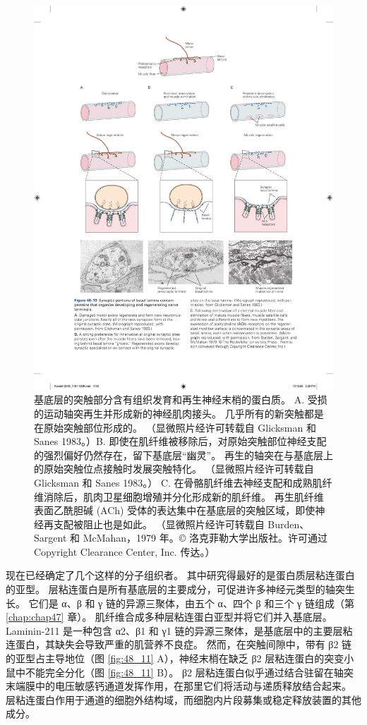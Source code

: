 \begin{figure}[htbp]
	\centering
	\includegraphics[width=0.9\linewidth]{chap48/fig_48_10}
	\caption{基底层的突触部分含有组织发育和再生神经末梢的蛋白质。 A. 受损的运动轴突再生并形成新的神经肌肉接头。 几乎所有的新突触都是在原始突触部位形成的。 （显微照片经许可转载自 Glicksman 和 Sanes 1983。）B. 即使在肌纤维被移除后，对原始突触部位神经支配的强烈偏好仍然存在，留下基底层“幽灵”。 再生的轴突在与基底层上的原始突触位点接触时发展突触特化。 （显微照片经许可转载自 Glicksman 和 Sanes 1983。） C. 在骨骼肌纤维去神经支配和成熟肌纤维消除后，肌肉卫星细胞增殖并分化形成新的肌纤维。 再生肌纤维表面乙酰胆碱 (ACh) 受体的表达集中在基底层的突触区域，即使神经再支配被阻止也是如此。 （显微照片经许可转载自 Burden、Sargent 和 McMahan，1979 年。© 洛克菲勒大学出版社。许可通过 Copyright Clearance Center, Inc. 传达。）}
	\label{fig:48_10}
\end{figure}

现在已经确定了几个这样的分子组织者。 其中研究得最好的是蛋白质层粘连蛋白的亚型。 层粘连蛋白是所有基底层的主要成分，可促进许多神经元类型的轴突生长。 它们是 α、β 和 γ 链的异源三聚体，由五个 α、四个 β 和三个 γ 链组成（第 \ref{chap:chap47} 章）。 肌纤维合成多种层粘连蛋白亚型并将它们并入基底层。 Laminin-211 是一种包含 α2、β1 和 γ1 链的异源三聚体，是基底层中的主要层粘连蛋白，其缺失会导致严重的肌营养不良症。 
然而，在突触间隙中，带有 β2 链的亚型占主导地位（图 \ref{fig:48_11} A），神经末梢在缺乏 β2 层粘连蛋白的突变小鼠中不能完全分化（图 \ref{fig:48_11} B）。 
β2 层粘连蛋白似乎通过结合驻留在轴突末端膜中的电压敏感钙通道发挥作用，在那里它们将活动与递质释放结合起来。 层粘连蛋白作用于通道的细胞外结构域，而细胞内片段募集或稳定释放装置的其他成分。

